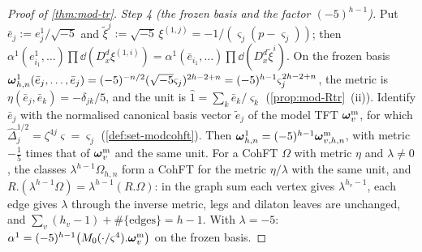 \begin{proof}[Proof of \cref{thm:mod-tr}]
\emph{Step 4 (the frozen basis and the factor $(-5)^{h-1}$).} Put $\bar e_j:=e^1_j/\sqrt{-5}$ and $\tilde\xi^j:=\sqrt{-5}\,\xi^{(1,j)}=-1/(\varsigma_j(p-\varsigma_j))$; then $\alpha^1(e^1_{i_1},\dots)\prod\dd(D_x^{d}\xi^{(1,i)})=\alpha^1(\bar e_{i_1},\dots)\prod\dd(D_x^{d}\tilde\xi^{i})$. On the frozen basis $\boldsymbol{\omega}^1_{h,n}(\bar e_j,\dots,\bar e_j)=(-5)^{-n/2}(\sqrt{-5}\varsigma_j)^{2h-2+n}=(-5)^{h-1}\varsigma_j^{2h-2+n}$, the metric is $\eta(\bar e_j,\bar e_k)=-\delta_{jk}/5$, and the unit is $\hat 1=\sum_k\bar e_k/\varsigma_k$ (\cref{prop:mod-Rtr}~(ii)). Identify $\bar e_j$ with the normalised canonical basis vector $\tilde e_j$ of the model TFT $\boldsymbol{\omega}^{\mathrm m}_v$, for which $\hat\Delta_j^{1/2}=\zeta^{4j}\varsigma=\varsigma_j$ (\cref{def:set-modcohft}). Then $\boldsymbol{\omega}^1_{h,n}=(-5)^{h-1}\boldsymbol{\omega}^{\mathrm m}_{v,h,n}$, with metric $-\frac15$ times that of $\boldsymbol{\omega}^{\mathrm m}_v$ and the same unit. For a CohFT $\Omega$ with metric $\eta$ and $\lambda\neq 0$, the classes $\lambda^{h-1}\Omega_{h,n}$ form a CohFT for the metric $\eta/\lambda$ with the same unit, and $R.(\lambda^{h-1}\Omega)=\lambda^{h-1}(R.\Omega)$: in the graph sum each vertex gives $\lambda^{h_v-1}$, each edge gives $\lambda$ through the inverse metric, legs and dilaton leaves are unchanged, and $\sum_v(h_v-1)+\#\{\text{edges}\}=h-1$. With $\lambda=-5$: $\alpha^1=(-5)^{h-1}\big(M_{0}(\cdot/\varsigma^4).\boldsymbol{\omega}^{\mathrm m}_v\big)$ on the frozen basis.


\end{proof}
